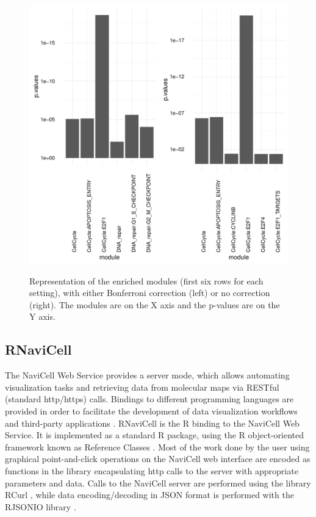 \begin{figure}[h!]
	\centering
	\caption{Representation of the enriched modules (first six rows for each setting), with either Bonferroni correction (left) or no correction (right). The modules are on the X axis and the p-values are on the Y axis.  }
	\includegraphics[width=\textwidth]{figures/comparison_corrected_unc_bars.pdf}
	\label{fig:barp}

\end{figure}




\subsection{RNaviCell}

The NaviCell Web Service provides a server mode, which allows automating
visualization tasks and retrieving data from molecular maps via RESTful
(standard http/https) calls. Bindings to different programming languages are
provided in order to facilitate the development of data visualization workflows and
third-party applications \citep{bonnet2015navicell}. RNaviCell is the R binding
to the NaviCell Web Service. It is implemented as a standard R package, using
the R object-oriented framework known as Reference Classes \citep{hwR5}. Most
of the work done by the user using graphical point-and-click operations on the
NaviCell web interface are encoded as functions in the library encapsulating
http calls to the server with appropriate parameters and data. Calls to the
NaviCell server are performed using the library RCurl \citep{rcurl2015}, while
data encoding/decoding in JSON format is performed with the RJSONIO library
\citep{rjsonio2014}.

